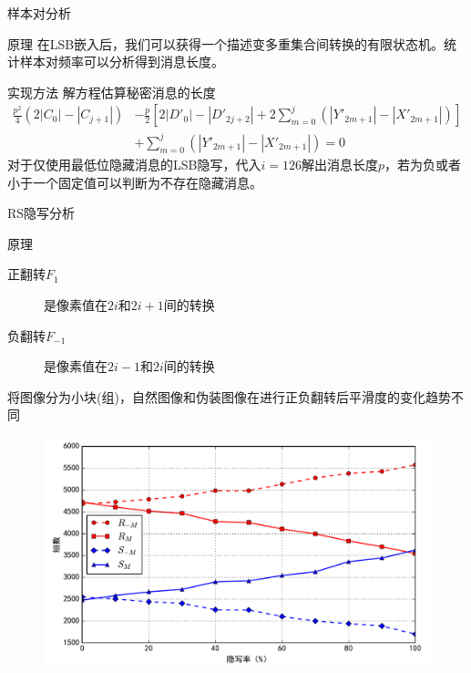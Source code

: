 \documentclass[14pt]{Bredelebeamer}
\begin{document}
\begin{frame}{样本对分析}
  \begin{exampleblock}{原理}
    在LSB嵌入后，我们可以获得一个描述变多重集合间转换的有限状态机。统计样本对频率可以分析得到消息长度。
  \end{exampleblock}
\pause
  \begin{block}{实现方法}
    解方程估算秘密消息的长度
    $$\begin{aligned}
    \frac{{{p^2}}}{4}\left( {2\left| {{C_0}} \right| - \left| {{C_{j + 1}}} \right|} \right) &- \frac{p}{2}\left[ {2\left| {D{'_0}} \right| - \left| {D{'_{2j + 2}}} \right| + 2\sum\limits_{m = 0}^j {\left( {\left| {Y{'_{2m + 1}}} \right| - \left| {X{'_{2m + 1}}} \right|} \right)} } \right] \\
    &+ \sum\limits_{m = 0}^j {\left( {\left| {Y{'_{2m + 1}}} \right| - \left| {X{'_{2m + 1}}} \right|} \right)}  = 0
    \end{aligned}$$
    对于仅使用最低位隐藏消息的LSB隐写，代入$i=126$解出消息长度$p$，若为负或者小于一个固定值可以判断为不存在隐藏消息。
  \end{block}
\end{frame}

\begin{frame}{RS隐写分析}
  \begin{exampleblock}{原理}
    \pause
  \begin{description}
    \item[正翻转$F_1$]是像素值在$2i$和$2i+1$间的转换
    \item[负翻转$F_{-1}$]是像素值在$2i-1$和$2i$间的转换
  \end{description}
  \pause
  将图像分为小块(组)，自然图像和伪装图像在进行正负翻转后平滑度的变化趋势不同
  \end{exampleblock}
  \pause
  \begin{figure}
    \centering
    \includegraphics[width=.75\textwidth]{images/rsdemo}
  \end{figure}
\end{frame}
\end{document}
